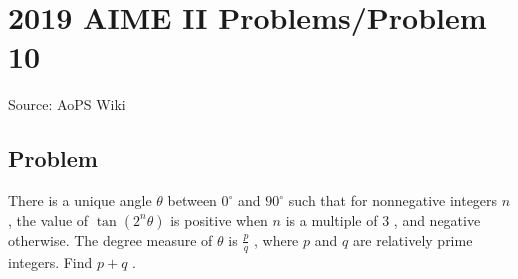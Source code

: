 \documentclass[12pt]{article}
\begin{document}
\section*{{2019 AIME II Problems/Problem 10}}
Source: AoPS Wiki

\subsection*{Problem}
There is a unique angle $\theta$ between $0^{\circ}$ and $90^{\circ}$ such that for nonnegative integers $n$ , the value of $\tan{\left(2^{n}\theta\right)}$ is positive when $n$ is a multiple of $3$ , and negative otherwise. The degree measure of $\theta$ is $\tfrac{p}{q}$ , where $p$ and $q$ are relatively prime integers. Find $p+q$ .
\end{document}
